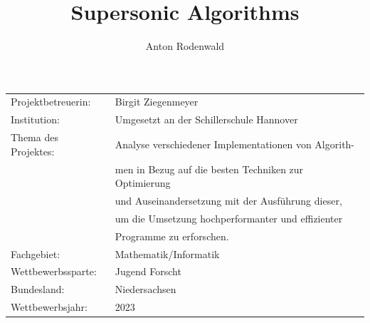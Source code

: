 \documentclass[12pt,a4paper]{article}
\begin{document}
\title{Supersonic Algorithms}
\author{Anton Rodenwald}

\maketitle

\large\begin{tabular}{l l}

    Projektbetreuerin: & Birgit Ziegenmeyer \\

    Institution: & Umgesetzt an der Schillerschule Hannover \\
    
    Thema des Projektes: 
    & Analyse verschiedener Implementationen von Algorith- \\
    & men in Bezug auf die besten Techniken zur Optimierung \\
    & und Auseinandersetzung mit der Ausführung dieser, \\
    & um die Umsetzung hochperformanter und effizienter \\
    & Programme zu erforschen. \\

    Fachgebiet: & Mathematik/Informatik \\

    Wettbewerbssparte: & Jugend Forscht \\
    
    Bundesland: & Niedersachsen \\
    
    Wettbewerbsjahr: & 2023 \\
    
\end{tabular}


\clearpage
\end{document}

